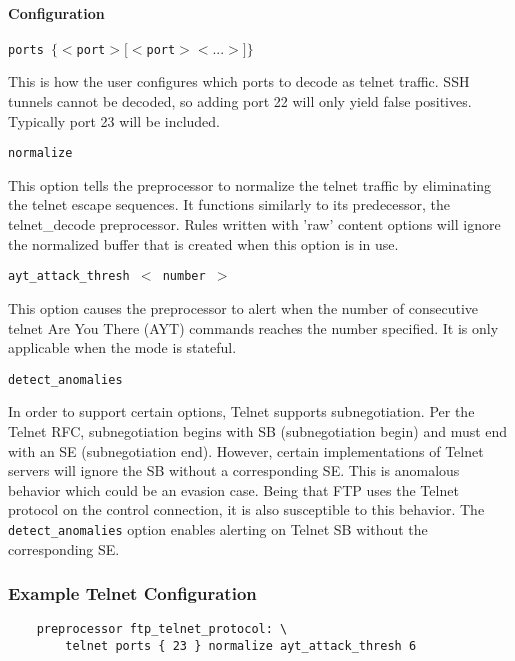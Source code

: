 \documentclass[english]{report}
\newcounter{slistnum}
\newenvironment{slist}
{ \begin{list}{ {\bf \arabic{slistnum}.} }{\usecounter{slistnum} } }
{ \end{list} }
\begin{document}
\paragraph{Configuration}
\begin{slist}
\item \texttt{ports $\{ <$port$> [<$port$> <...>] \}$}

This is how the user configures which ports to decode as telnet traffic.  SSH
tunnels cannot be decoded, so adding port 22 will only yield false positives.
Typically port 23 will be included.

\item \texttt{normalize}

This option tells the preprocessor to normalize the telnet traffic by
eliminating the telnet escape sequences.  It functions similarly to its
predecessor, the telnet\_decode preprocessor.  Rules written with 'raw' content
options will ignore the normalized buffer that is created when this option is
in use.

\item \texttt{ayt\_attack\_thresh $<$ number $>$}

This option causes the preprocessor to alert when the number of consecutive
telnet Are You There (AYT) commands reaches the number specified.  It is only
applicable when the mode is stateful.

\item \texttt{detect\_anomalies}

In order to support certain options, Telnet supports subnegotiation. Per the
Telnet RFC, subnegotiation begins with SB (subnegotiation begin) and must end
with an SE (subnegotiation end). However, certain implementations of Telnet
servers will ignore the SB without a corresponding SE. This is anomalous
behavior which could be an evasion case. Being that FTP uses the Telnet
protocol on the control connection, it is also susceptible to this behavior.
The \texttt{detect\_anomalies} option enables alerting on Telnet SB without the
corresponding SE.

\end{slist}

\subsubsection{Example Telnet Configuration}

\begin{verbatim}
    preprocessor ftp_telnet_protocol: \
        telnet ports { 23 } normalize ayt_attack_thresh 6
\end{verbatim}
\end{document}
